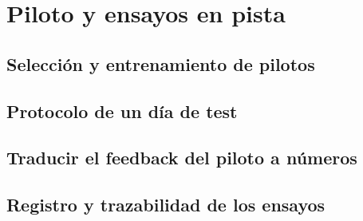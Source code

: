 \chapter{Piloto y ensayos en pista}
\label{ch:piloto_ensayos_pista}

\begin{objetivos}
  \item {}
  \item {}
  \item {}
\end{objetivos}


\section{Selección y entrenamiento de pilotos}
\label{sec:piloto_ensayos_pista:01}

\section{Protocolo de un día de test}
\label{sec:piloto_ensayos_pista:02}

\section{Traducir el feedback del piloto a números}
\label{sec:piloto_ensayos_pista:03}

\section{Registro y trazabilidad de los ensayos}
\label{sec:piloto_ensayos_pista:04}


\begin{caso}
\end{caso}

